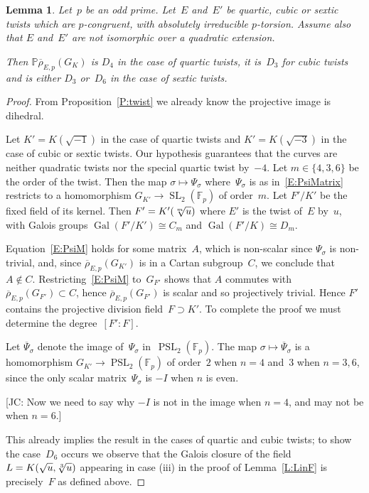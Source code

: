 \documentclass[12pt, reqno]{amsart}
\newcommand{\F}{\mathbb{F}}
\newcommand{\PP}{\mathbb{P}}
\newcommand{\rhobar}{{\overline{\rho}}}
\DeclareMathOperator{\Gal}{Gal}
\newcommand{\PSL}{\operatorname{PSL}}
\newcommand{\SL}{\operatorname{SL}}
\numberwithin{equation}{section}
\newtheorem{lemma}[theorem]{Lemma}
\theoremstyle{definition}
\theoremstyle{remark}
\newcommand{\jc}[1]{{\color{darkgreen} \textsf{[JC: #1]}}}
\begin{document}
\begin{lemma}\label{L:dihedral}
Let~$p$ be an odd prime. Let~$E$ and~$E'$ be quartic, cubic or sextic
twists which are $p$-congruent, with absolutely irreducible
$p$-torsion. Assume also that $E$ and~$E'$ are not isomorphic over a
quadratic extension.

Then $\PP\rhobar_{E,p}(G_K)$ is $D_4$ in the case of quartic twists,
it is~$D_3$ for cubic twists and is either $D_3$ or~$D_6$ in the case
of sextic twists.
\end{lemma}
\begin{proof} From Proposition~\ref{P:twist} we already know the
  projective image is dihedral.

Let $K'=K(\sqrt{-1})$ in the case of quartic twists and
$K'=K(\sqrt{-3})$ in the case of cubic or sextic twists. Our
hypothesis guarantees that the curves are neither quadratic twists nor
the special quartic twist by~$-4$.  Let $m\in\{4,3,6\}$ be the order
of the twist.  Then the map $\sigma \mapsto \Psi_\sigma$
where~$\Psi_\sigma$ is as in~\eqref{E:PsiMatrix} restricts to a homomorphism
$G_{K'}\to\SL_2(\F_p)$ of order~$m$.  Let $F'/K'$ be the fixed field
of its kernel.  Then $F'=K'(\root m\of u)$ where $E'$ is the twist
of~$E$ by~$u$, with Galois groups $\Gal(F'/K')\cong C_m$ and
$\Gal(F'/K)\cong D_m$.

Equation~\eqref{E:PsiM} holds for some matrix~$A$, which is non-scalar
since $\Psi_{\sigma}$ is non-trivial, and, since
$\rhobar_{E,p}(G_{K'})$ is in a Cartan subgroup~$C$, we conclude that
$A \not\in C$. Restricting~\eqref{E:PsiM} to~$G_{F'}$ shows that $A$
commutes with $\rhobar_{E,p}(G_{F'}) \subset C$, hence
$\rhobar_{E,p}(G_{F'})$ is scalar and so projectively trivial.  Hence
$F'$ contains the projective division field~$F \supset K'$.  To complete the
proof we must determine the degree~$[F':F]$.

Let $\overline{\Psi}_{\sigma}$ denote the image of~$\Psi_{\sigma}$
in~$\PSL_2(\F_p)$.  The map $\sigma \mapsto \overline{\Psi}_\sigma$ is
a homomorphism $G_{K'}\to\PSL_2(\F_p)$ of order~$2$ when $n=4$ and~$3$
when $n=3,6$, since the only scalar matrix~$\Psi_{\sigma}$ is $-I$
when $n$ is even.


\jc{Now we need to say why $-I$ is not in the image when $n=4$, and
  may not be when $n=6$.}

This already implies the result in the cases of quartic and cubic
twists; to show the case~$D_6$ occurs we observe that the Galois
closure of the field~$L=K(\sqrt{u},\root 3 \of u)$ appearing in case
(iii) in the proof of Lemma~\ref{L:LinF} is precisely~$F$ as defined
above.
\end{proof}
\end{document}
